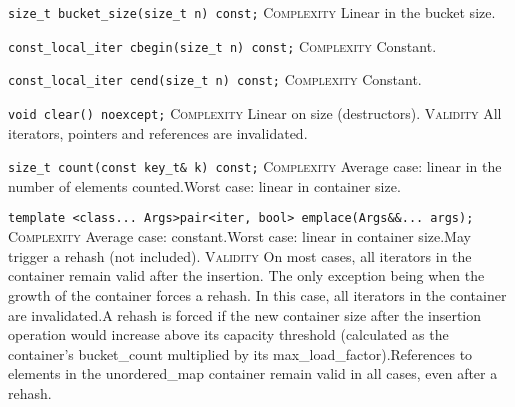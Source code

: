 \noindent{}\hspace*{0.25em}\lstinline[basicstyle=\ttfamily\color{corange}]{size_t bucket_size(size_t n) const;} \textsc{Complexity} Linear in the bucket size.\\\vspace{-0.6em}

\noindent{}\hspace*{0.25em}\lstinline[basicstyle=\ttfamily\color{cgreen}]{const_local_iter cbegin(size_t n) const;} \textsc{Complexity} Constant.\\\vspace{-0.6em}

\noindent{}\hspace*{0.25em}\lstinline[basicstyle=\ttfamily\color{cgreen}]{const_local_iter cend(size_t n) const;} \textsc{Complexity} Constant.\\\vspace{-0.6em}

\noindent{}\hspace*{0.25em}\lstinline[basicstyle=\ttfamily\color{corange}]{void clear() noexcept;} \textsc{Complexity} Linear on size (destructors). \textsc{Validity} All iterators, pointers and references are invalidated.\\\vspace{-0.6em}

\noindent{}\hspace*{0.25em}\lstinline[basicstyle=\ttfamily\color{corange}]{size_t count(const key_t& k) const;} \textsc{Complexity} Average case: linear in the number of elements counted.Worst case: linear in container size.\\\vspace{-0.6em}

\noindent{}\hspace*{0.25em}\lstinline[basicstyle=\ttfamily\color{corange}]{template <class... Args>pair<iter, bool> emplace(Args&&... args);} \textsc{Complexity} Average case: constant.Worst case: linear in container size.May trigger a rehash (not included). \textsc{Validity} On most cases, all iterators in the container remain valid after the insertion. The only exception being when the growth of the container forces a rehash. In this case, all iterators in the container are invalidated.A rehash is forced if the new container size after the insertion operation would increase above its capacity threshold (calculated as the container's bucket\_count multiplied by its max\_load\_factor).References to elements in the unordered\_map container remain valid in all cases, even after a rehash.\\\vspace{-0.6em}

